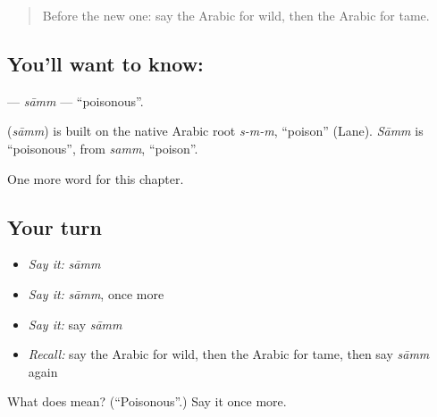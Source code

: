\label{lesson:AR-C242-samm}



\begin{quote}
Before the new one: say the Arabic for wild, then the Arabic for tame.
\end{quote}

\subsection*{You'll want to know: }
\textbf{} — \emph{sāmm} — \textquotedblleft{}poisonous\textquotedblright{}.

\begin{cousinweb}
\textbf{} (\emph{sāmm}) is built on the native Arabic root \emph{s-m-m}, \textquotedblleft{}poison\textquotedblright{} (Lane). \emph{Sāmm} is \textquotedblleft{}poisonous\textquotedblright{}, from \emph{samm}, \textquotedblleft{}poison\textquotedblright{}.
\end{cousinweb}

\begin{grammarlens}[title={What you've built}]
One more word for this chapter.
\end{grammarlens}

\subsection*{Your turn}
\begin{itemize}
\raggedright
  \item \emph{Say it:} \emph{sāmm}
  \item \emph{Say it:} \emph{sāmm}, once more
  \item \emph{Say it:} say \emph{sāmm}
  \item \emph{Recall:} say the Arabic for wild, then the Arabic for tame, then say \emph{sāmm} again
\end{itemize}

\begin{tcolorbox}[breakable,colback=teal!4,colframe=teal!35!black,title={Before you move on}]
What does  mean? (\textquotedblleft{}Poisonous\textquotedblright{}.) Say it once more.
\end{tcolorbox}
